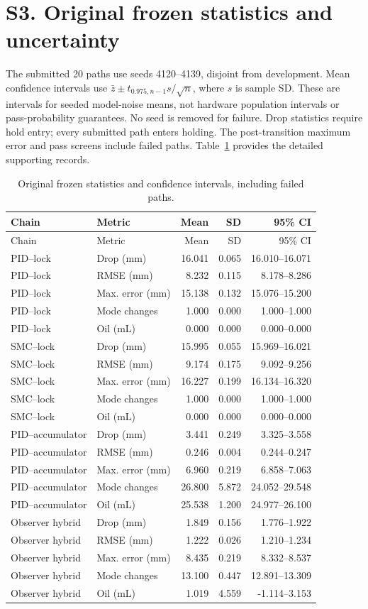 \documentclass[11pt,a4paper]{article}
\begin{document}
\section*{S3. Original frozen statistics and uncertainty}
The submitted 20 paths use seeds 4120--4139, disjoint from development. Mean confidence intervals use $\bar z\pm t_{0.975,n-1}s/\sqrt n$, where $s$ is sample SD. These are intervals for seeded model-noise means, not hardware population intervals or pass-probability guarantees. No seed is removed for failure. Drop statistics require hold entry; every submitted path enters holding. The post-transition maximum error and pass screens include failed paths.
Table~\ref{supp:longtable:2} provides the detailed supporting records.
\begin{longtable}{p{.23\linewidth}p{.26\linewidth}rrr}\caption{Original frozen statistics and confidence intervals, including failed paths.}\label{supp:longtable:2}\\\toprule Chain & Metric & Mean & SD & 95\% CI\\\midrule\endfirsthead
\toprule Chain & Metric & Mean & SD & 95\% CI\\\midrule\endhead
PID--lock & Drop (mm) & 16.041 & 0.065 & 16.010--16.071 \\
PID--lock & RMSE (mm) & 8.232 & 0.115 & 8.178--8.286 \\
PID--lock & Max. error (mm) & 15.138 & 0.132 & 15.076--15.200 \\
PID--lock & Mode changes & 1.000 & 0.000 & 1.000--1.000 \\
PID--lock & Oil (mL) & 0.000 & 0.000 & 0.000--0.000 \\
SMC--lock & Drop (mm) & 15.995 & 0.055 & 15.969--16.021 \\
SMC--lock & RMSE (mm) & 9.174 & 0.175 & 9.092--9.256 \\
SMC--lock & Max. error (mm) & 16.227 & 0.199 & 16.134--16.320 \\
SMC--lock & Mode changes & 1.000 & 0.000 & 1.000--1.000 \\
SMC--lock & Oil (mL) & 0.000 & 0.000 & 0.000--0.000 \\
PID--accumulator & Drop (mm) & 3.441 & 0.249 & 3.325--3.558 \\
PID--accumulator & RMSE (mm) & 0.246 & 0.004 & 0.244--0.247 \\
PID--accumulator & Max. error (mm) & 6.960 & 0.219 & 6.858--7.063 \\
PID--accumulator & Mode changes & 26.800 & 5.872 & 24.052--29.548 \\
PID--accumulator & Oil (mL) & 25.538 & 1.200 & 24.977--26.100 \\
Observer hybrid & Drop (mm) & 1.849 & 0.156 & 1.776--1.922 \\
Observer hybrid & RMSE (mm) & 1.222 & 0.026 & 1.210--1.234 \\
Observer hybrid & Max. error (mm) & 8.435 & 0.219 & 8.332--8.537 \\
Observer hybrid & Mode changes & 13.100 & 0.447 & 12.891--13.309 \\
Observer hybrid & Oil (mL) & 1.019 & 4.559 & -1.114--3.153 \\
\bottomrule\end{longtable}
\end{document}
